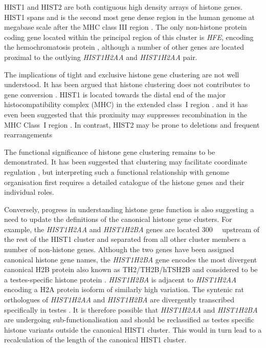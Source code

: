     HIST1 and HIST2 are both contiguous high density arrays of histone genes.
    HIST1 spans 
    and is the second most gene dense region in the human genome at
    megabase scale after the MHC class III region \citep{MHC-III-analysis}.
    The only non-histone protein coding gene located within the principal region of this cluster
    is \textit{HFE}, encoding the hemochromatosis protein \citep{AlbigDoenecke1998},
    although a number of other genes are located
    proximal to the outlying \textit{HIST1H2AA} and \textit{HIST1H2AA} pair.

    The implications of tight and exclusive histone gene clustering are not well understood.
    It has been argued that histone clustering 
    does not contributes to gene conversion \citep{NeiRooney2005}.
    HIST1 is located towards the distal end of the major histocompatibility complex (MHC)
    in the extended class~I region \citep{MHC-I-transcript, MHC-complete-sequencing-1999}.
    and it has even been suggested that this proximity 
    may suppresses recombination in the MHC Class~I region \citep{MHC-repressed-by-HIST}.
    In contrast, HIST2 may be prone to deletions and frequent rearrangements
    \citep{HISTTwo-prone-deletion-discovery, HISTTwo-prone-deletion-focus}

    The functional significance of histone gene clustering remains to be demonstrated.
    It has been suggested that clustering may facilitate coordinate regulation \citep{Eirinlopez2009,close-regulators},
    but interpreting such a functional relationship with genome organisation 
    first requires a detailed catalogue of the histone genes and their individual roles.

    Conversely, progress in understanding histone gene function
    is also suggesting a need to update 
    the definitions of the canonical histone gene clusters.
    For example, the \textit{HIST1H2AA} and \textit{HIST1H2BA} genes 
    are located \SI{300}{\kilo\bp} upstream of the rest of the HIST1 cluster
    and separated from all other cluster members a number of non-histone genes.
    Although the two genes have been assigned canonical histone gene names, 
    the \textit{HIST1H2BA} gene encodes the most divergent canonical H2B protein
    also known as TH2/TH2B/hTSH2B and considered to be 
    a testes-specific histone protein \citep{Zalensky2002,LiAusio2005,Shinagawa2014}.
    \textit{HIST1H2BA} is adjacent to \textit{HIST1H2AA} encoding 
    a H2A protein isoform of similarly high variation.
    The syntenic rat orthologues of \textit{HIST1H2AA} and \textit{HIST1H2BA}
    are divergently transcribed specifically in testes \citep{HuhChae1991}.
    It is therefore possible that \textit{HIST1H2AA} and \textit{HIST1H2BA}
    are undergoing sub-functionalisation and should be reclassified
    as testes specific histone variants outside the canonical HIST1 cluster.
    This would in turn lead to a recalculation of the length of the canonical HIST1 cluster.


